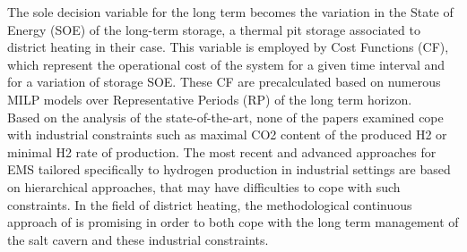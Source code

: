 The sole decision variable for the long term becomes the variation in the State of Energy (SOE) of the long-term storage, a thermal pit storage associated to district heating in their case. This variable is employed by Cost Functions (CF), which represent the operational cost of the system for a given time interval and for a variation of storage SOE. These CF are precalculated based on numerous MILP models over Representative Periods (RP) of the long term horizon.
\\

Based on the analysis of the state-of-the-art, none of the papers examined cope with industrial constraints such as maximal CO2 content of the produced H2 or minimal H2 rate of production. The most recent and advanced approaches for EMS tailored specifically to hydrogen production in industrial settings are based on hierarchical approaches, that may have difficulties to cope with such constraints. In the field of district heating, the methodological continuous approach of \cite{cuisinier_new_2022} is promising in order to both cope with the long term management of the salt cavern and these industrial constraints.
